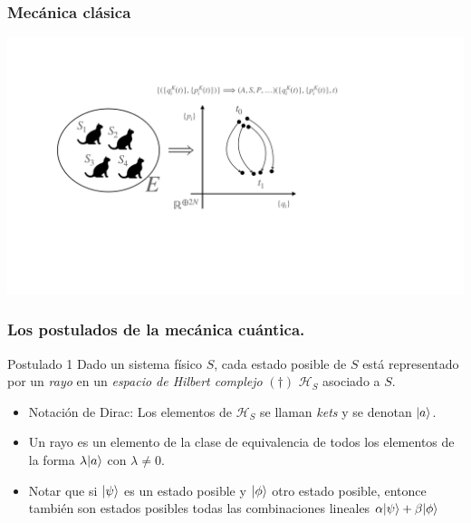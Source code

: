 \documentclass{beamer}
\begin{document}
\begin{frame}
    \frametitle{Mecánica clásica}
    \begin{center}
        \includegraphics[scale=0.3]{figs/cats_04.pdf}
    \end{center}

\end{frame}

\begin{frame}
    \frametitle{Los postulados de la mecánica cuántica.}
    
    \begin{block}{Postulado 1}
        Dado un sistema físico $S$, cada estado posible de $S$ está representado por un {\em rayo} en un {\em espacio de Hilbert complejo} $(\dagger)$ $\mathcal{H}_S$ asociado a $S$. 
    \end{block}
    
    \begin{itemize}
        \item Notación de Dirac: Los elementos de $\mathcal{H}_S$ se llaman {\em kets} y se denotan $| a \rangle$.
        \item Un rayo es un elemento de la clase de equivalencia de todos los elementos de la forma ${\lambda| a \rangle}$ con $\lambda \neq 0$.
        \item Notar que si $| \psi \rangle$ es un estado posible y $| \phi \rangle$ otro estado posible, entonce también son estados posibles todas las combinaciones lineales $\alpha| \psi \rangle+\beta| \phi \rangle$
    \end{itemize}
   
    
\end{frame} 
\end{document}
